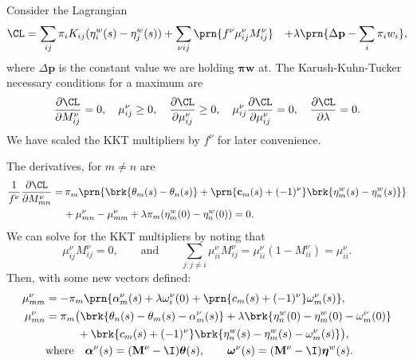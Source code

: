 \documentclass[12pt]{article}
\newcommand{\prm}{p}
\newcommand{\pr}{\mathbf{\prm}}
\newcommand{\eqm}{\pi}
\newcommand{\eq}{\boldsymbol{\eqm}}
\newcommand{\etwm}{\eta^w}
\newcommand{\etw}{\boldsymbol{\eta}^w}
\newcommand{\thbm}{\theta}
\newcommand{\thb}{\boldsymbol{\thbm}}
\newcommand{\ombm}{\omega}
\newcommand{\omb}{\boldsymbol{\ombm}}
\newcommand{\albm}{\alpha}
\newcommand{\alb}{\boldsymbol{\albm}}
\newcommand{\wm}{w}
\newcommand{\w}{\mathbf{\wm}}
\newcommand{\MMdm}{M}
\newcommand{\MMd}{\mathbf{\MMdm}}
\newcommand{\encm}{K}
\renewcommand{\pdiff}[2]{\frac{\partial #1}{\partial #2}}
\begin{document}
Consider the Lagrangian
%
\begin{equation}\label{eq:finitelagrangian}
\begin{aligned}
  \CL =&\, \sum_{ij} \eqm_i \encm_{ij} (\etwm_i(s) - \etwm_j(s))
        +\sum_{\nu i j} \prn{ f^\nu \mu^\nu_{ij} \MMdm^\nu_{ij} }
        &+ \lambda \prn{ \Delta\pr - \sum_i \eqm_i \wm_i },
\end{aligned}
\end{equation}
%
where $\Delta\pr$ is the constant value we are holding $\eq\w$ at.
The Karush-Kuhn-Tucker necessary conditions for a maximum are
%
\begin{equation}\label{eq:KTfinite}
  \pdiff{\CL}{\MMdm^\nu_{ij}} = 0, \quad
  \mu^\nu_{ij} \geq 0, \quad
  \pdiff{\CL}{\mu^\nu_{ij}} \geq 0, \quad
  \mu^\nu_{ij}\pdiff{\CL}{\mu^\nu_{ij}} = 0, \quad
  \pdiff{\CL}{\lambda} = 0.
\end{equation}
%
We have scaled the KKT multipliers by \(f^\nu\) for later convenience.

The derivatives, for $m \neq n$ are
%
\begin{equation}\label{eq:finitederivs}
\begin{aligned}
  \frac{1}{f^\nu} \pdiff{\CL}{\MMdm^\nu_{mn}} = & \,
    \eqm_m \prn{ \brk{\thbm_m(s) - \thbm_n(s)}
     + \prn{\mathbf{c}_m(s) + (-1)^\nu} \brk{\etwm_m(s) - \etwm_n(s)} } \\
     &+ \mu^\nu_{mn} -  \mu^\nu_{mm}
     + \lambda \eqm_m (\etwm_{m}(0)-\etwm_{n}(0)) 
    = 0.
\end{aligned}
\end{equation}
%
We can solve for the KKT multipliers by noting that
%
\begin{equation*}
  \mu^\nu_{ij} \MMdm^\nu_{ij} = 0,
  \qquad \text{and} \qquad
  \sum_{j: j \neq i} \mu^\nu_{ii} \MMdm^\nu_{ij} 
      = \mu^\nu_{ii} (1 - \MMdm^\nu_{ii}) = \mu^\nu_{ii}.
\end{equation*}
%
Then, with some new vectors defined:
%
\begin{equation}\label{eq:kktsol}
\begin{aligned}
  \mu^\nu_{mm} &= - \eqm_m \prn{ \albm^\nu_m(s) 
    + \lambda \ombm^\nu_i(0) 
    + \prn{{c}_m(s) + (-1)^\nu} \ombm^\nu_m(s)
    }, \\
  \mu^\nu_{mn} &= \eqm_m \big( 
      \brk{ \thbm_n(s) - \thbm_m(s) - \albm^\nu_m(s) }
    + \lambda \brk{ \etwm_n(0) - \etwm_m(0) - \ombm^\nu_m(0) } 
  \\ &\phantom{= \eqm_m \big( }
    + \brk{{c}_m(s) + (-1)^\nu} 
        \brk{ \etwm_n(s) - \etwm_m(s) - \ombm^\nu_m(s) }
     \big), \\
  &\text{where} \quad 
  \alb^\nu(s) = (\MMd^\nu - \I) \thb(s), \qquad
  \omb^\nu(s) = (\MMd^\nu - \I) \etw(s).
\end{aligned}
\end{equation}
%
\end{document}
